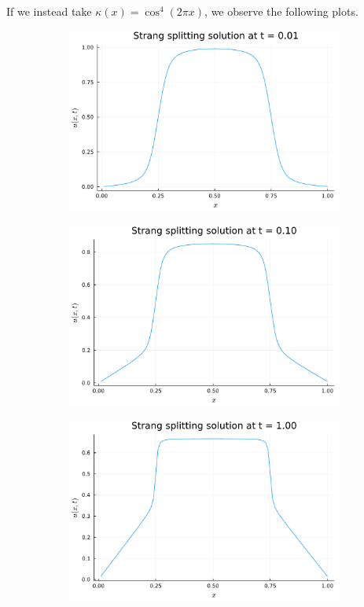 \documentclass{article}
\begin{document}
If we instead take $\kappa(x) = \cos^4(2\pi x)$, we observe the following plots.
\begin{figure}[H]
	\centering
	\begin{subfigure}{0.495\linewidth}
		\centering
		\includegraphics[width=\linewidth]{p4bt0.01.pdf}
	\end{subfigure}
	\begin{subfigure}{0.495\linewidth}
		\centering
		\includegraphics[width=\linewidth]{p4bt0.10.pdf}
	\end{subfigure}
	\begin{subfigure}{0.495\linewidth}
		\centering
		\includegraphics[width=\linewidth]{p4bt1.00.pdf}
	\end{subfigure}
\end{figure}
\end{document}
